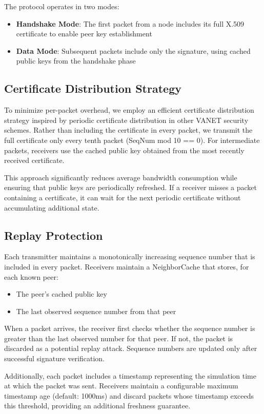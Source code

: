 \documentclass[conference]{IEEEtran}
\begin{document}
The protocol operates in two modes:
\begin{itemize}
    \item \textbf{Handshake Mode}: The first packet from a node includes its full X.509 certificate to enable peer key establishment
    \item \textbf{Data Mode}: Subsequent packets include only the signature, using cached public keys from the handshake phase
\end{itemize}

\subsection{Certificate Distribution Strategy}

To minimize per-packet overhead, we employ an efficient certificate distribution strategy inspired by periodic certificate distribution in other VANET security schemes. Rather than including the certificate in every packet, we transmit the full certificate only every tenth packet (SeqNum mod 10 == 0). For intermediate packets, receivers use the cached public key obtained from the most recently received certificate.

This approach significantly reduces average bandwidth consumption while ensuring that public keys are periodically refreshed. If a receiver misses a packet containing a certificate, it can wait for the next periodic certificate without accumulating additional state.

\subsection{Replay Protection}

Each transmitter maintains a monotonically increasing sequence number that is included in every packet. Receivers maintain a NeighborCache that stores, for each known peer:
\begin{itemize}
    \item The peer's cached public key
    \item The last observed sequence number from that peer
\end{itemize}

When a packet arrives, the receiver first checks whether the sequence number is greater than the last observed number for that peer. If not, the packet is discarded as a potential replay attack. Sequence numbers are updated only after successful signature verification.

Additionally, each packet includes a timestamp representing the simulation time at which the packet was sent. Receivers maintain a configurable maximum timestamp age (default: 1000ms) and discard packets whose timestamp exceeds this threshold, providing an additional freshness guarantee.
\end{document}
